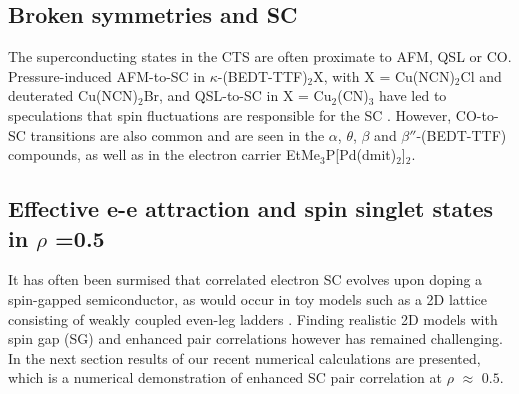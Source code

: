 \documentclass[a4paper,12pt]{article}
\begin{document}
\subsection{Broken symmetries and SC}
The superconducting states in the CTS are often proximate to AFM, QSL or CO. Pressure-induced AFM-to-SC in $\kappa$-(BEDT-TTF)$_{2}$X, 
with X = Cu(NCN)$_{2}$Cl and deuterated Cu(NCN)$_{2}$Br, and QSL-to-SC in X = Cu$_{2}$(CN)$_{3}$ have led to speculations that
spin fluctuations are responsible for the SC \cite{nevidomskyy08a,kino98a,schmalian98a}. However, CO-to-SC transitions
are also common and are seen in the $\alpha$, $\theta$, $\beta$ and  $\beta''$-(BEDT-TTF) compounds, 
as well as in the electron carrier EtMe$_{3}$P[Pd(dmit)$_{2}$]$_{2}$. 

\subsection{Effective e-e attraction and spin singlet states in $\rho$ =0.5}
It has often been surmised that correlated electron SC evolves upon doping a spin-gapped semiconductor, 
as would occur in toy models such as a 2D lattice consisting of weakly coupled even-leg ladders \cite{arrigoni04a,troyer96a}.
Finding realistic 2D models with spin gap (SG) and enhanced pair correlations however has remained challenging. 
In the next section results of our recent numerical calculations \cite{ngomes16} are presented, which is a numerical demonstration
of enhanced SC pair correlation at $\rho$ $\approx$ $0.5$.
\end{document}
